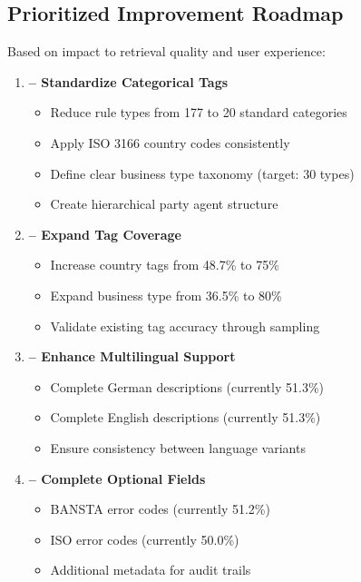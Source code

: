 \subsection{Prioritized Improvement Roadmap}

Based on impact to retrieval quality and user experience:

\begin{enumerate}[leftmargin=*,itemsep=4pt,topsep=4pt]
 \item \textbf{ -- Standardize Categorical Tags}
   \begin{itemize}[leftmargin=*,itemsep=1pt,topsep=1pt]
     \item Reduce rule types from 177 to 20 standard categories
     \item Apply ISO 3166 country codes consistently  
     \item Define clear business type taxonomy (target: 30 types)
     \item Create hierarchical party agent structure
   \end{itemize}
   
 \item \textbf{ -- Expand Tag Coverage}
   \begin{itemize}[leftmargin=*,itemsep=1pt,topsep=1pt]
     \item Increase country tags from 48.7\% to 75\%
     \item Expand business type from 36.5\% to 80\%
     \item Validate existing tag accuracy through sampling
   \end{itemize}
   
 \item \textbf{ -- Enhance Multilingual Support}
   \begin{itemize}[leftmargin=*,itemsep=1pt,topsep=1pt]
     \item Complete German descriptions (currently 51.3\%)
     \item Complete English descriptions (currently 51.3\%)
     \item Ensure consistency between language variants
   \end{itemize}
   
 \item \textbf{ -- Complete Optional Fields}
   \begin{itemize}[leftmargin=*,itemsep=1pt,topsep=1pt]
     \item BANSTA error codes (currently 51.2\%)
     \item ISO error codes (currently 50.0\%)
     \item Additional metadata for audit trails
   \end{itemize}
\end{enumerate}

